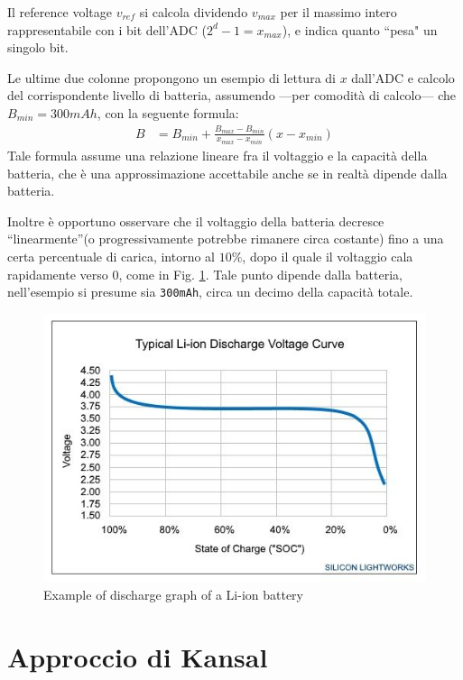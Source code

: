 Il reference voltage $v_{ref}$ si calcola dividendo $v_{max}$ per il massimo intero rappresentabile con i bit dell'ADC ($2^d -1 = x_{max}$), e indica quanto ``pesa" un singolo bit.

Le ultime due colonne propongono un esempio di lettura di $x$ dall'ADC e calcolo del corrispondente livello di batteria, assumendo ---per comodità di calcolo--- che $B_{min} = 300mAh$, con la seguente formula:
\begin{align}
    B&= B_{min} + \frac{B_{max}-B_{min}}{x_{max} - x_{min}}(x-x_{min})
\end{align}
Tale formula assume una relazione lineare fra il voltaggio e la capacità della batteria, che è una approssimazione accettabile anche se in realtà dipende dalla batteria.
\begin{paracol}{2}
    \colfill
    Inoltre è opportuno osservare che il voltaggio della batteria decresce ``linearmente''(o progressivamente potrebbe rimanere circa costante) fino a una certa percentuale di carica, intorno al $10\%$, dopo il quale il voltaggio cala rapidamente verso 0, come in Fig. \ref{fig:discharge}.
    Tale punto dipende dalla batteria, nell'esempio si presume sia \texttt{300mAh}, circa un decimo della capacità totale.
    \colfill
    \switchcolumn
    \begin{figure}
        \centering
        \includegraphics{images/questions/discharge.png}
        \caption{Example of discharge graph of a Li-ion battery}
        \label{fig:discharge}
    \end{figure}
\end{paracol}

\section{Approccio di Kansal}

